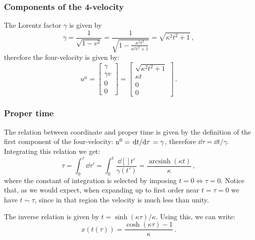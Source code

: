 \documentclass[main.tex]{subfiles}
\begin{document}
\subsubsection{Components of the 4-velocity}

The Lorentz factor \(\gamma \) is given by
%
\begin{equation} \label{eq:constant-acceleration-gamma}
  \gamma = \frac{1}{\sqrt{1-v^2}}
  = \frac{1}{\sqrt{1 - \frac{\kappa^{2} t^{2}}{\kappa^{2} t^{2} + 1} }}
  = \sqrt{\kappa^2 t^2 + 1} \,,
\end{equation}
%
therefore the four-velocity is given by:
%
\begin{equation}
  u^{\mu } =
  \begin{bmatrix}
  \gamma  \\
  \gamma v \\
  0 \\
  0
  \end{bmatrix}
  =
  \begin{bmatrix}
    \sqrt{\kappa^2 t^2 + 1}  \\
    \kappa t \\
    0 \\
    0
  \end{bmatrix}\,.
\end{equation}

\subsubsection{Proper time}

The relation between coordinate and proper time is given by the definition of the first component of the four-velocity: \(u^{0} = \dv*{t}{\tau} = \gamma \), therefore \(\dd{\tau } = \dd{t} / \gamma \).
Integrating this relation we get:
%
\begin{equation}
    \tau = \int_0^{\tau} \dd{\tau'} 
    = \int_0^{t} \frac{\dd[]{t'} }{\gamma(t')}
    = \displaystyle \frac{\operatorname{arcsinh}{\left(\kappa t \right)}}{\kappa}\,,
\end{equation}
%
where the constant of integration is selected by imposing \(t = 0 \iff \tau = 0\).
Notice that, as we would expect, when expanding up to first order near \(t = \tau = 0 \) we have \(t \sim \tau \), since in that region the velocity is much less than unity.

The inverse relation is given by \(t = \sinh (\kappa \tau ) / \kappa \). Using this, we can write:
%
\begin{equation}
  x (t(\tau ))  =\frac{\cosh{\left(\kappa \tau \right)} - 1}{\kappa}\,.
\end{equation}
\end{document}
